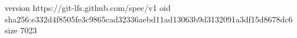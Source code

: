 version https://git-lfs.github.com/spec/v1
oid sha256:e332d4f8505fe3c9865cad32336aebd11ad13063b9d3132091a3df15d8678dc6
size 7023
